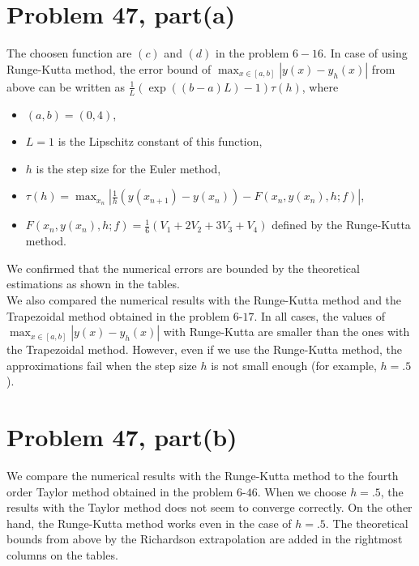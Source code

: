 \documentclass[dvipdfmx]{article}
\begin{document}
\section{Problem 47, part(a)}
The choosen function are $(c)$ and $(d)$ in the problem $6-16$.
In case of using Runge-Kutta method, the error bound of $\max_{x \in [a,b]}\left|y(x)-y_h(x)\right|$ from above can be written as 
$\frac{1}{L}\left(\exp\left((b-a)L\right) - 1\right) \tau(h)$, 
where 
\begin{itemize}
  \item $(a,b) = (0, 4)$,
  \item $L = 1$ is the Lipschitz constant of this function, 
  \item $h$ is the step size for the Euler method,
  \item $\tau(h) = \max_{x_n} \left|\frac{1}{h}\left(y(x_{n+1})-y(x_n)\right) - F(x_n, y(x_n), h; f)\right|$,
  \item $F(x_n, y(x_n), h; f) = \frac{1}{6}\left(V_1 + 2V_2 + 3V_3 + V_4\right)$
        defined by the Runge-Kutta method.
\end{itemize}

We confirmed that the numerical errors are bounded by the theoretical estimations as shown in the tables.\\
We also compared the numerical results with the Runge-Kutta method and the Trapezoidal method obtained in the problem $6$-$17$. In all cases, the values of $\max_{x \in [a,b]}\left|y(x)-y_h(x)\right|$ with Runge-Kutta are smaller than the ones with the Trapezoidal method. 
However, even if we use the Runge-Kutta method, the approximations fail when the step size $h$ is not small enough (for example, $h=.5$).

\newpage
\section{Problem 47, part(b)}
We compare the numerical results with the Runge-Kutta method to the fourth order Taylor method obtained in the problem $6$-$46$. When we choose $h=.5$, the results with the Taylor method does not seem to converge correctly. On the other hand, the Runge-Kutta method works even in the case of $h=.5$.
The theoretical bounds from above by the Richardson extrapolation are added in the rightmost columns on the tables.
\end{document}
